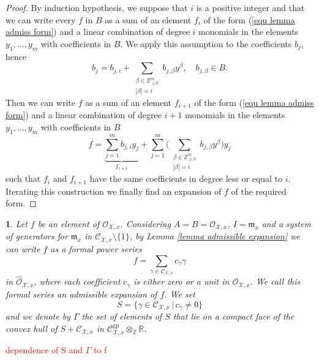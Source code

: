 \documentclass{amsart}%
\numberwithin{equation}{subsection}
\theoremstyle{plain2}
\theoremstyle{definition2}
\theoremstyle{stepstyle}
\theoremstyle{point}
\theoremstyle{subpoint}
\newtheorem{subpoint}[equation]{}%
\newcommand{\spa}[1]{\begin{subpoint}#1\end{subpoint}}           %
\newcommand{\Z}{\ensuremath{\mathbb{Z}}}
\newcommand{\R}{\ensuremath{\mathbb{R}}}
\newcommand{\cX}{\ensuremath{\mathscr{X}}}
\newcommand{\caC}{\ensuremath{\mathcal{C}}}
\newcommand{\caO}{\ensuremath{\mathcal{O}}}
\renewcommand{\R}{\ensuremath{\mathbb{R}}}
\newcommand{\gp}{\mathrm{gp}}
\begin{document}
{\begin{proof}
By induction hypothesis, we suppose that $i$ is a positive integer and that we can write every $f$ in $B$ as a sum of an element $f_i$ of the form (\ref{equ lemma admiss form}) and a linear combination of degree $i$ monomials in the elements $y_1,\ldots, y_m$ with coefficients in $B$. We apply this assumption to the coefficients $b_j$, hence
$$b_j=b_{j,i} + \sum_{\substack{\beta \in \Z^m_{\geqslant 0} \\|\beta|=i}} b_{j,\beta} y^\beta, \quad b_{j, \beta} \in B.$$ Then we can write $f$ as a sum of an element $f_{i+1}$ of the form (\ref{equ lemma admiss form}) and a linear combination of degree $i+1$ monomials in the elements $y_1,\ldots,y_m$ with coefficients in $B$
$$ f=\underbrace{\sum_{j=1}^{m} b_{j,i} y_j}_{f_{i+1}} + \sum_{j=1}^{m}\Big( \sum_{\substack{\beta \in \Z^m_{\geqslant 0} \\|\beta|=i}} b_{j,\beta} y^\beta \Big) y_j$$ such that $f_i$ and $f_{i+1}$ have the same coefficients in degree less or equal to $i$. Iterating this construction we finally find an expansion of $f$ of the required form.
\end{proof}}

\spa{ \label{paragr admissible expansion}Let $f$ be an element of $\mathcal{O}_{\cX,x}$. Considering $A=B=\caO_{\cX,x}$, $I=\mathfrak{m}_x$ and a system of generators for $\mathfrak{m}_x$ in $\caC_{\cX,x} \setminus \{1\}$, by Lemma \ref{lemma admissible expansion} we can write $f$ as a formal power series
\begin{equation}\label{eq-adm}
f=\sum_{\gamma \in \mathcal{C}_{\cX,x}}c_{\gamma}\gamma
\end{equation}
 in
$\widehat{\mathcal{O}}_{\cX,x}$, where each coefficient $c_\gamma$
 is either zero or a unit in $\mathcal{O}_{\cX,x}$. We call this formal series an \textit{admissible expansion} of $f$. We set
 \begin{equation}\label{equ def S}
S=\{\gamma\in\mathcal{C}_{\cX,x}\,|\,c_\gamma\neq 0\}
 \end{equation} and we denote by $\Gamma$ the set of
 elements of $S$ that lie on a compact face of the convex hull of
$S+ \mathcal{C}_{\cX,x}$ in
$\mathcal{C}^{\gp}_{\cX,x}\otimes_{\Z}\R$.}

\textcolor{red}{dependence of S and $\Gamma$ to f }
\end{document}
